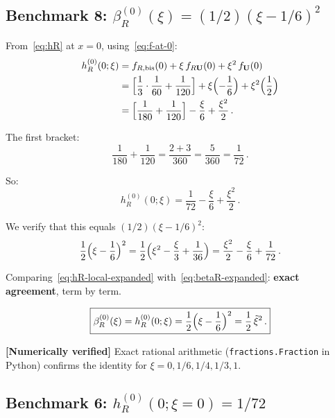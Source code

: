 \documentclass[11pt,a4paper]{article}
\newcommand{\xitilde}{\tilde{\xi}}
\theoremstyle{definition}
\theoremstyle{remark}
\newcommand{\verified}[1]{%
  \par\noindent\colorbox{green!10}{%
    \parbox{\dimexpr\linewidth-2\fboxsep}{%
      \textcolor{green!50!black}{\textbf{[Numerically verified]}}
      \textcolor{green!50!black}{#1}%
    }%
  }\par%
}
\begin{document}
\subsection{Benchmark 8: $\beta_R^{(0)}(\xi) = (1/2)(\xi - 1/6)^2$}

From~\eqref{eq:hR} at $x = 0$, using~\eqref{eq:f-at-0}:
\begin{align}
  h_R^{(0)}(0;\xi) &= f_{R,\text{bis}}(0) + \xi\,f_{R\mathbf{U}}(0)
  + \xi^2\,f_{\mathbf{U}}(0)
  \nonumber\\
  &= \Bigl[\frac{1}{3}\cdot\frac{1}{60} + \frac{1}{120}\Bigr]
  + \xi\Bigl(-\frac{1}{6}\Bigr) + \xi^2\Bigl(\frac{1}{2}\Bigr)
  \nonumber\\
  &= \Bigl[\frac{1}{180} + \frac{1}{120}\Bigr]
  - \frac{\xi}{6} + \frac{\xi^2}{2}\,.
  \label{eq:hR-local-step1}
\end{align}

The first bracket:
\begin{equation*}
  \frac{1}{180} + \frac{1}{120}
  = \frac{2 + 3}{360} = \frac{5}{360} = \frac{1}{72}\,.
\end{equation*}

So:
\begin{equation}
  h_R^{(0)}(0;\xi) = \frac{1}{72} - \frac{\xi}{6} + \frac{\xi^2}{2}\,.
  \label{eq:hR-local-expanded}
\end{equation}

We verify that this equals $(1/2)(\xi - 1/6)^2$:
\begin{equation}
  \frac{1}{2}\Bigl(\xi - \frac{1}{6}\Bigr)^2
  = \frac{1}{2}\Bigl(\xi^2 - \frac{\xi}{3} + \frac{1}{36}\Bigr)
  = \frac{\xi^2}{2} - \frac{\xi}{6} + \frac{1}{72}\,.
  \label{eq:betaR-expanded}
\end{equation}

Comparing~\eqref{eq:hR-local-expanded} with~\eqref{eq:betaR-expanded}:
\textbf{exact agreement}, term by term.

\begin{equation}
  \boxed{\beta_R^{(0)}(\xi) = h_R^{(0)}(0;\xi)
  = \frac{1}{2}\Bigl(\xi - \frac{1}{6}\Bigr)^2
  = \frac{1}{2}\,\xitilde^2\,.}
  \label{eq:benchmark8}
\end{equation}

\verified{Exact rational arithmetic (\texttt{fractions.Fraction} in
Python) confirms the identity for $\xi = 0, 1/6, 1/4, 1/3, 1$.}


\subsection{Benchmark 6: $h_R^{(0)}(0;\xi=0) = 1/72$}
\end{document}
